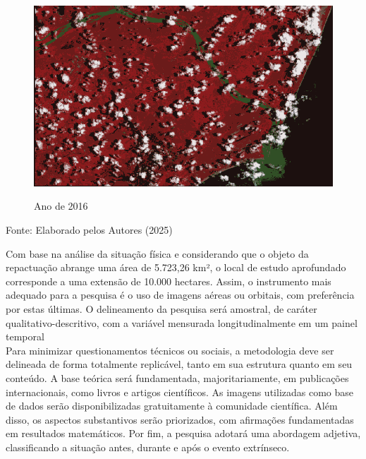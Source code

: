 			\begin{minipage}[t!]{0.33\textwidth}
				\begin{figure}[H]
					\centering \small \caption{Ano de 2016}
					\includegraphics[width=0.97\linewidth]{FIGURAS/20160202rcompre}
					\label{fig:indao3} 
				\end{figure}					
			\end{minipage} 
			\begin{center}
				Fonte:   Elaborado pelos Autores (2025)
			\end{center}

  \hspace*{1.25 cm} Com base na análise da situação física e considerando que o objeto da repactuação abrange uma área de 5.723,26 km², o local de estudo aprofundado corresponde a uma extensão de 10.000 hectares. Assim, o instrumento mais adequado para a pesquisa é o uso de imagens aéreas ou orbitais, com preferência por estas últimas. O delineamento da pesquisa será amostral, de caráter qualitativo-descritivo, com a variável mensurada longitudinalmente em um painel temporal\\
    \hspace*{1.25 cm} Para minimizar questionamentos técnicos ou sociais, a metodologia deve ser delineada de forma totalmente replicável, tanto em sua estrutura quanto em seu conteúdo. A base teórica será fundamentada, majoritariamente, em publicações internacionais, como livros e artigos científicos. As imagens utilizadas como base de dados serão disponibilizadas gratuitamente à comunidade científica. Além disso, os aspectos substantivos serão priorizados, com afirmações fundamentadas em resultados matemáticos. Por fim, a pesquisa adotará uma abordagem adjetiva, classificando a situação antes, durante e após o evento extrínseco.

